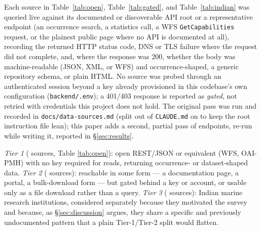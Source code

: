  Each source in Table~\ref{tab:open}, Table~\ref{tab:gated},
and Table~\ref{tab:indian} was queried live against its documented or
discoverable API root or a representative endpoint (an occurrence search, a
statistics call, a WFS \texttt{GetCapabilities} request, or the plainest
public page where no API is documented at all), recording the returned HTTP
status code, DNS or TLS failure where the request did not complete, and,
where the response was 200, whether the body was machine-readable (JSON,
XML, or WFS) and occurrence-shaped, a generic repository schema, or plain
HTML. No source was probed through an authenticated session beyond a key
already provisioned in this codebase's own configuration
(\texttt{backend/.env}); a 401/403 response is reported as \emph{gated}, not
retried with credentials this project does not hold. The original pass was
run \ProbeDate{} and recorded in \texttt{docs/data-sources.md} (split out of
\texttt{CLAUDE.md} on \SplitDate{} to keep the root instruction file
lean); this paper adds a second, partial pass of \NEndpointsReprobed{}
endpoints, re-run \AsOf{} while writing it, reported in
\S\ref{sec:results}.

 \emph{Tier 1} (\NTierOne{} sources, Table
\ref{tab:open}): open REST/JSON or equivalent (WFS, OAI-PMH) with no key
required for reads, returning occurrence- or dataset-shaped data. \emph{Tier
2} (\NTierTwo{} sources): reachable in some form --- a documentation page, a
portal, a bulk-download form --- but gated behind a key or account, or usable
only as a file download rather than a query. \emph{Tier 3} (\NTierThree{}
sources): Indian marine research institutions, considered separately because
they motivated the survey and because, as \S\ref{sec:discussion} argues, they
share a specific and previously undocumented pattern that a plain
Tier-1/Tier-2 split would flatten.

